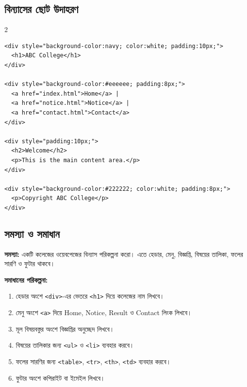 \subsection{বিন্যাসের ছোট উদাহরণ}

\par{}\par
\begin{multicols}{2}
\begin{verbatim}
<div style="background-color:navy; color:white; padding:10px;">
  <h1>ABC College</h1>
</div>

<div style="background-color:#eeeeee; padding:8px;">
  <a href="index.html">Home</a> |
  <a href="notice.html">Notice</a> |
  <a href="contact.html">Contact</a>
</div>

<div style="padding:10px;">
  <h2>Welcome</h2>
  <p>This is the main content area.</p>
</div>

<div style="background-color:#222222; color:white; padding:8px;">
  <p>Copyright ABC College</p>
</div>
\end{verbatim}
\end{multicols}


\subsection{সমস্যা ও সমাধান}

\begin{practicebox}
\textbf{সমস্যা:} একটি কলেজের ওয়েবপেজের বিন্যাস পরিকল্পনা করো। এতে হেডার, মেনু, বিজ্ঞপ্তি, বিষয়ের তালিকা, ফলের সারণি ও ফুটার থাকবে।

\textbf{সমাধানের পরিকল্পনা:}
\begin{enumerate}
\item হেডার অংশে \texttt{<div>}-এর ভেতরে \texttt{<h1>} দিয়ে কলেজের নাম লিখবে।
\item মেনু অংশে \texttt{<a>} দিয়ে Home, Notice, Result ও Contact লিংক লিখবে।
\item মূল বিষয়বস্তুর অংশে বিজ্ঞপ্তির অনুচ্ছেদ লিখবে।
\item বিষয়ের তালিকার জন্য \texttt{<ul>} ও \texttt{<li>} ব্যবহার করবে।
\item ফলের সারণির জন্য \texttt{<table>}, \texttt{<tr>}, \texttt{<th>}, \texttt{<td>} ব্যবহার করবে।
\item ফুটার অংশে কপিরাইট বা ইমেইল লিখবে।
\end{enumerate}
\end{practicebox}

